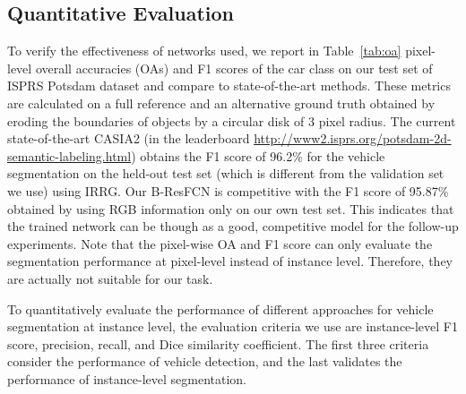 \documentclass[journal]{IEEEtran}
\newcommand{\RR}[2]{\textcolor[rgb]{0,0,0}
{#2}}
\begin{document}
\subsection{Quantitative Evaluation}
To verify the effectiveness of networks used, we report in Table~\ref{tab:oa} pixel-level overall accuracies (OAs) and F1 scores \RR{}{of the car class} on our test set of ISPRS Potsdam dataset and compare to state-of-the-art methods. These metrics are calculated on a full reference and an alternative ground truth obtained by eroding the boundaries of objects by a circular disk of 3 pixel radius. \RR{}{The current state-of-the-art CASIA2 (in the leaderboard \url{http://www2.isprs.org/potsdam-2d-semantic-labeling.html}) obtains the F1 score of 96.2\% for the vehicle segmentation on the held-out test set (which is different from the validation set we use) using IRRG.} Our B-ResFCN is competitive with the F1 score of 95.87\% obtained by using RGB information only on our own test set. This indicates that the trained network can be though as a good, competitive model for the follow-up experiments. Note that the pixel-wise OA and F1 score can only evaluate the segmentation performance at \RR{}{pixel-level} instead of instance level. Therefore, they are actually not suitable for our task.
\par
To quantitatively evaluate the performance of different approaches for vehicle segmentation at instance level, the evaluation criteria we use are instance-level F1 score, precision, recall, and Dice similarity coefficient. The first three criteria consider the performance of vehicle detection, and the last validates the performance of instance-level segmentation.
\end{document}
